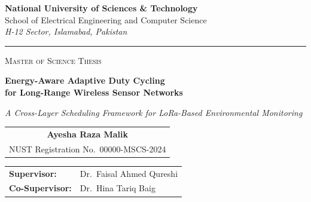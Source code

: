 \documentclass[12pt,a4paper]{report}
\begin{document}
\begin{titlepage}
\begin{center}

\vspace*{6pt}


\vspace{10pt}

{\Large\bfseries\color{nustgreen} National University of Sciences \& Technology}\\[2pt]
{\large\color{nustslate} School of Electrical Engineering and Computer Science}\\[2pt]
{\small\itshape\color{nustslate} H-12 Sector, Islamabad, Pakistan}

\vspace{6pt}
{\color{nustgold}\rule{0.55\textwidth}{1pt}}
\vspace{28pt}

{\large\scshape\color{nustslate} Master of Science Thesis}

\vspace{28pt}

{\LARGE\bfseries\color{nustgreen}
Energy-Aware Adaptive Duty Cycling\\[4pt]
for Long-Range Wireless Sensor Networks}

\vspace{10pt}
{\large\itshape\color{nustslate} A Cross-Layer Scheduling Framework for LoRa-Based Environmental Monitoring}

\vspace{36pt}

\begin{tabular}{c}
{\large\bfseries Ayesha Raza Malik}\\[2pt]
{\normalsize NUST Registration No.\ 00000-MSCS-2024}
\end{tabular}

\vspace{36pt}

\begin{tabular}{ll}
{\bfseries Supervisor:} & Dr.\ Faisal Ahmed Qureshi\\
{\bfseries Co-Supervisor:} & Dr.\ Hina Tariq Baig\\
\end{tabular}


\end{center}
\end{titlepage}
\end{document}
